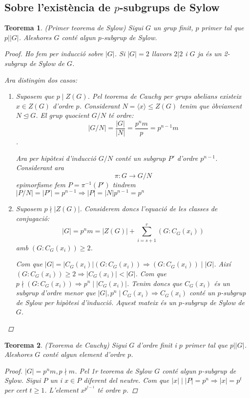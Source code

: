 \documentclass[a4paper,11pt]{report}
\newcommand{\inv}[1]{#1^{-1}}
\renewcommand{\div}{\mid}
\newcommand{\ordre}[1]{|#1|}
\theoremstyle{theorem}
\newtheorem{teorema}{\normalfont \sffamily\bfseries Teorema}[section]
\theoremstyle{definition}
\begin{document}
\subsection{Sobre l'existència de $p$-subgrups de Sylow}
\begin{teorema}{(Primer teorema de Sylow)}
	Sigui $G$ un grup finit, $p$ primer tal que $p\big| |G|$. Aleshores $G$ conté algun $p$-subgrup de Sylow.
	\begin{proof}
		Ho fem per inducció sobre $|G|$. Si $|G|=2$ llavors $2|2$ i $G$ ja és un 2-subgrup de Sylow de $G$.
		
		Ara distingim dos casos:
		\begin{enumerate}
			\item Suposem que $p\div Z(G)$. Pel teorema de Cauchy per grups abelians existeix $x\in Z(G)$ d'ordre $p$. Considerant $N=\langle x\rangle \leq Z(G)$ tenim que òbviament $N\unlhd G$. El grup quocient $G/N$ té ordre:
			$$\ordre{G/N}=\frac{\ordre{G}}{\ordre{N}}=\frac{p^nm}{p}=p^{n-1}m$$.
			
			Ara per hipòtesi d'inducció $G/N$ conté un subgrup $P'$ d'ordre $p^{n-1}$. Considerant ara $$\pi:G\longrightarrow G/N$$ epimorfisme fem $P=\inv{\pi}(P')$ tindrem $|P/N|=|P'|=p^{n-1}\Rightarrow \ordre{P}=\ordre{N}p^{n-1}=p^n$
			\item Suposem $p\nmid\ordre{Z(G)}$. Considerem doncs l'equació de les classes de conjugació:
			$$\ordre{G}=p^nm=\ordre{Z(G)}+\sum_{i=s+1}^{r}(G:C_G(x_i))$$
			 amb $(G:C_G(x_i))\geq 2$.
			 
			 Com que $|G|=|C_G(x_i)|(G: C_G(x_i))\Rightarrow (G: C_G(x_i))\div\ordre{G}$. Així $(G: C_G(x_i))\geq 2\Rightarrow \ordre{C_G(x_i)}<\ordre{G}$. Com que $p\nmid(G: C_G(x_i))\Rightarrow p^n\div\ordre{C_G(x_i)}$.
			 Tenim doncs que $C_G(x_i)$ és un subgrup d'ordre menor que $\ordre{G},p^n\div C_G (x_i)\Rightarrow C_G(x_i)$ conté un $p$-subgrup de Sylow per hipòtesi d'inducció. Aquest mateix és un $p$-subgrup de Sylow de $G$.
			 
			\end{enumerate}
	\end{proof}
\end{teorema}
\begin{teorema}
	{(Teorema de Cauchy)} Sigui $G$ d'ordre finit i $p$ primer tal que $p\big| |G|$. Aleshores $G$ conté algun element d'ordre $p$.
	\begin{proof}
		$\ordre{G}=p^nm, p\nmid m$. Pel 1r teorema de Sylow $G$ conté algun $p$-subgrup de Sylow. Sigui $P$ un i $x\in P$ diferent del neutre. Com que $\ordre{x}\div\ordre{P}=p^n\Rightarrow \ordre{x}=p^t$ per cert $t\geq 1$. L'element $x^{p^{t-1}}$ té ordre $p$.
	\end{proof}
\end{teorema}
\end{document}
